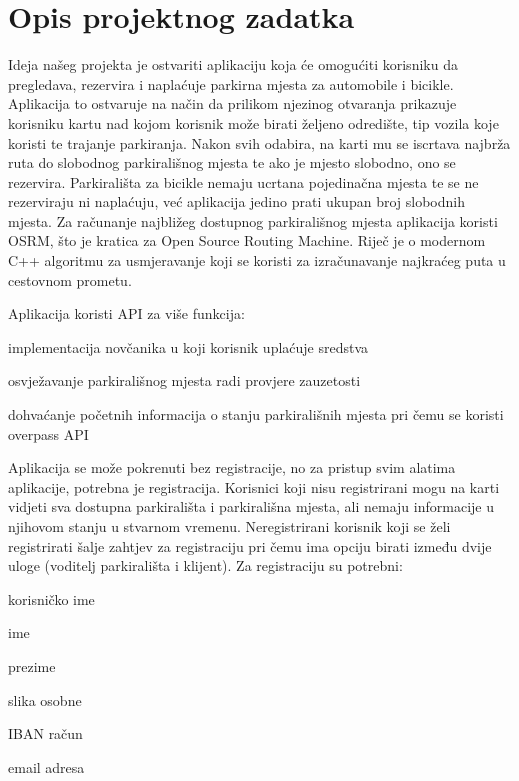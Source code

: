 \chapter{Opis projektnog zadatka}
		


		Ideja našeg projekta je ostvariti aplikaciju koja će omogućiti korisniku da pregledava, rezervira i naplaćuje parkirna mjesta za automobile i bicikle.
		Aplikacija to ostvaruje na način da prilikom njezinog otvaranja prikazuje korisniku kartu nad kojom korisnik može birati željeno odredište, tip vozila koje koristi te trajanje parkiranja. Nakon svih odabira, na karti mu se iscrtava najbrža ruta do slobodnog parkirališnog mjesta te ako je mjesto slobodno, ono se rezervira. Parkirališta za bicikle nemaju ucrtana pojedinačna mjesta te se ne rezerviraju ni naplaćuju, već aplikacija jedino prati ukupan broj slobodnih mjesta.
		Za računanje najbližeg dostupnog parkirališnog mjesta aplikacija koristi OSRM, što je kratica za Open Source Routing Machine. Riječ je o modernom C++ algoritmu za usmjeravanje koji se koristi za izračunavanje najkraćeg puta u cestovnom prometu. 
		
	    \noindent Aplikacija koristi API za više funkcija:
		\begin{packed_item}
			\item implementacija novčanika u koji korisnik uplaćuje sredstva
			\item osvježavanje parkirališnog mjesta radi provjere zauzetosti
			\item dohvaćanje početnih informacija o stanju parkirališnih mjesta pri čemu se koristi overpass API
		\end{packed_item}
		 
		Aplikacija se može pokrenuti bez registracije, no za pristup svim alatima aplikacije, potrebna je registracija. Korisnici koji nisu registrirani mogu na karti vidjeti sva dostupna parkirališta i parkirališna mjesta, ali nemaju informacije u njihovom stanju u stvarnom vremenu. Neregistrirani korisnik koji se želi registrirati šalje zahtjev za registraciju pri čemu ima opciju birati između dvije uloge (voditelj parkirališta i klijent). Za registraciju su potrebni:
		\begin{packed_item}
			\item korisničko ime
			\item ime
			\item prezime
			\item slika osobne
			\item IBAN račun
			\item email adresa
		\end{packed_item}
		
